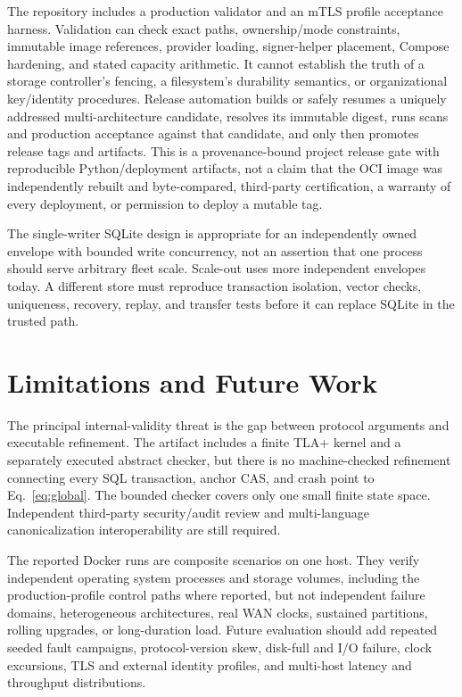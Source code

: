 \documentclass[10pt]{article}
\begin{document}
The repository includes a production validator and an mTLS profile acceptance harness. Validation
can check exact paths, ownership/mode constraints, immutable image references, provider loading,
signer-helper placement, Compose hardening, and stated capacity arithmetic. It cannot establish
the truth of a storage controller's fencing, a filesystem's durability semantics, or organizational
key/identity procedures. Release automation builds or safely resumes a uniquely addressed
multi-architecture candidate, resolves
its immutable digest, runs scans and production acceptance against that candidate, and only then
promotes release tags and artifacts. This is a provenance-bound project release gate with
reproducible Python/deployment artifacts, not a claim that the OCI image was independently rebuilt
and byte-compared, third-party certification, a warranty of every deployment, or permission to
deploy a mutable tag.

The single-writer SQLite design is appropriate for an independently owned envelope with bounded
write concurrency, not an assertion that one process should serve arbitrary fleet scale. Scale-out
uses more independent envelopes today. A different store must reproduce transaction isolation,
vector checks, uniqueness, recovery, replay, and transfer tests before it can replace SQLite in the
trusted path.

\section{Limitations and Future Work}

The principal internal-validity threat is the gap between protocol arguments and executable
refinement. The artifact includes a finite TLA+ kernel and a separately executed abstract checker,
but there is no machine-checked refinement connecting every SQL transaction, anchor CAS, and crash
point to Eq.~\ref{eq:global}. The bounded checker covers only one small finite state space.
Independent third-party security/audit review and multi-language canonicalization interoperability
are still required.

The reported Docker runs are composite scenarios on one host. They verify independent operating
system processes and storage volumes, including the production-profile control paths where
reported, but not independent failure domains, heterogeneous architectures, real WAN clocks,
sustained partitions, rolling upgrades, or long-duration load.
Future evaluation should add repeated seeded fault campaigns, protocol-version skew, disk-full and
I/O failure, clock excursions, TLS and external identity profiles, and multi-host latency and
throughput distributions.
\end{document}
